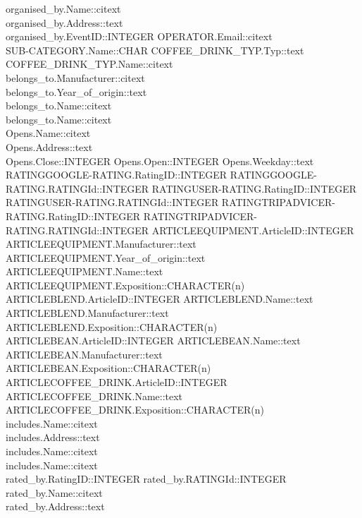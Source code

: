 organised\_by.Name::citext\\
organised\_by.Address::text\\
organised\_by.EventID::INTEGER
OPERATOR.Email::citext\\
SUB-CATEGORY.Name::CHAR
COFFEE\_DRINK\_TYP.Typ::text\\
COFFEE\_DRINK\_TYP.Name::citext\\
belongs\_to.Manufacturer::citext\\
belongs\_to.Year\_of\_origin::text\\
belongs\_to.Name::citext\\
belongs\_to.Name::citext\\
Opens.Name::citext\\
Opens.Address::text\\
Opens.Close::INTEGER
Opens.Open::INTEGER
Opens.Weekday::text\\
RATINGGOOGLE-RATING.RatingID::INTEGER
RATINGGOOGLE-RATING.RATINGId::INTEGER
RATINGUSER-RATING.RatingID::INTEGER
RATINGUSER-RATING.RATINGId::INTEGER
RATINGTRIPADVICER-RATING.RatingID::INTEGER
RATINGTRIPADVICER-RATING.RATINGId::INTEGER
ARTICLEEQUIPMENT.ArticleID::INTEGER
ARTICLEEQUIPMENT.Manufacturer::text\\
ARTICLEEQUIPMENT.Year\_of\_origin::text\\
ARTICLEEQUIPMENT.Name::text\\
ARTICLEEQUIPMENT.Exposition::CHARACTER(n)\\
ARTICLEBLEND.ArticleID::INTEGER
ARTICLEBLEND.Name::text\\
ARTICLEBLEND.Manufacturer::text\\
ARTICLEBLEND.Exposition::CHARACTER(n)\\
ARTICLEBEAN.ArticleID::INTEGER
ARTICLEBEAN.Name::text\\
ARTICLEBEAN.Manufacturer::text\\
ARTICLEBEAN.Exposition::CHARACTER(n)\\
ARTICLECOFFEE\_DRINK.ArticleID::INTEGER
ARTICLECOFFEE\_DRINK.Name::text\\
ARTICLECOFFEE\_DRINK.Exposition::CHARACTER(n)\\
includes.Name::citext\\
includes.Address::text\\
includes.Name::citext\\
includes.Name::citext\\
rated\_by.RatingID::INTEGER
rated\_by.RATINGId::INTEGER
rated\_by.Name::citext\\
rated\_by.Address::text\\
